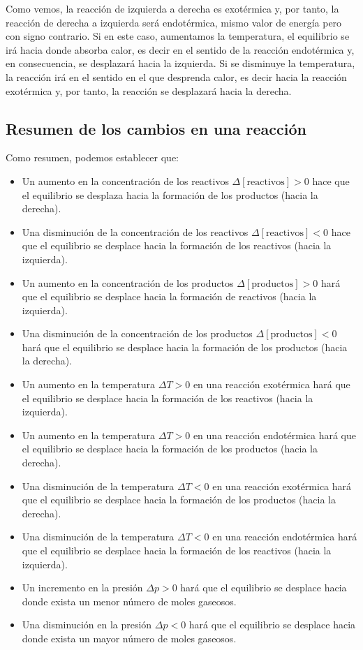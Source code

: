 Como vemos, la reacción de izquierda a derecha es exotérmica y, por tanto, la reacción de derecha a izquierda será endotérmica, mismo valor de energía pero con signo contrario.
Si en este caso, aumentamos la temperatura, el equilibrio se irá hacia donde absorba calor, es decir en el sentido de la reacción endotérmica y, en consecuencia, se desplazará hacia la izquierda.
Si se disminuye la temperatura, la reacción irá en el sentido en el que desprenda calor, es decir hacia la reacción exotérmica y, por tanto, la reacción se desplazará hacia la derecha.

\subsection{Resumen de los cambios en una reacción}\label{subsec:resumen-de-los-cambios-en-una-reaccion}

Como resumen, podemos establecer que:
\begin{itemize}
    \item Un aumento en la concentración de los reactivos \( \Delta [\text{reactivos}] > 0 \) hace que el equilibrio se desplaza hacia la formación de los productos (hacia la derecha).
    \item Una disminución de la concentración de los reactivos \( \Delta [\text{reactivos}] < 0 \) hace que el equilibrio se desplace hacia la formación de los reactivos (hacia la izquierda).
    \item Un aumento en la concentración de los productos \( \Delta [\text{productos}] > 0 \) hará que el equilibrio se desplace hacia la formación de reactivos (hacia la izquierda).
    \item Una disminución de la concentración de los productos \( \Delta [\text{productos}] < 0 \) hará que el equilibrio se desplace hacia la formación de los productos (hacia la derecha).
    \item Un aumento en la temperatura \( \Delta T > 0 \) en una reacción exotérmica hará que el equilibrio se desplace hacia la formación de los reactivos (hacia la izquierda).
    \item Un aumento en la temperatura \( \Delta T > 0 \) en una reacción endotérmica hará que el equilibrio se desplace hacia la formación de los productos (hacia la derecha).
    \item Una disminución de la temperatura \( \Delta T < 0 \) en una reacción exotérmica hará que el equilibrio se desplace hacia la formación de los productos (hacia la derecha).
    \item Una disminución de la temperatura \( \Delta T < 0 \) en una reacción endotérmica hará que el equilibrio se desplace hacia la formación de los reactivos (hacia la izquierda).
    \item Un incremento en la presión \( \Delta p > 0 \) hará que el equilibrio se desplace hacia donde exista un menor número de moles gaseosos.
    \item Una disminución en la presión \( \Delta p < 0 \) hará que el equilibrio se desplace hacia donde exista un mayor número de moles gaseosos.
\end{itemize}



